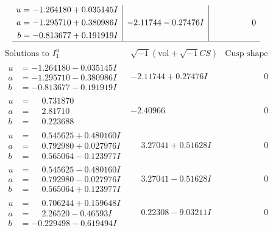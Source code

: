 \documentclass[1p]{elsarticle_modified}
\theoremstyle{definition}
\newcommand{\I}{\sqrt{-1}}
\begin{document}
$$\begin{array}{c|c|c}
\begin{aligned}
u &= -1.264180 + 0.035145 I \\
a &= -1.295710 + 0.380986 I \\
b &= -0.813677 + 0.191919 I\end{aligned}
 & -2.11744 - 0.27476 I & \phantom{-0.000000 } 0\\
 \hline 
 \end{array}$$\newpage$$\begin{array}{c|c|c}  
\text{Solutions to }I^u_{1}& \I (\text{vol} + \sqrt{-1}CS) & \text{Cusp shape}\\
 \hline 
\begin{aligned}
u &= -1.264180 - 0.035145 I \\
a &= -1.295710 - 0.380986 I \\
b &= -0.813677 - 0.191919 I\end{aligned}
 & -2.11744 + 0.27476 I & \phantom{-0.000000 } 0 \\ \hline\begin{aligned}
u &= \phantom{-}0.731870\phantom{ +0.000000I} \\
a &= \phantom{-}2.81710\phantom{ +0.000000I} \\
b &= \phantom{-}0.223688\phantom{ +0.000000I}\end{aligned}
 & -2.40966\phantom{ +0.000000I} & \phantom{-0.000000 } 0 \\ \hline\begin{aligned}
u &= \phantom{-}0.545625 + 0.480160 I \\
a &= \phantom{-}0.792980 + 0.027976 I \\
b &= \phantom{-}0.565064 - 0.123977 I\end{aligned}
 & \phantom{-}3.27041 + 0.51628 I & \phantom{-0.000000 } 0 \\ \hline\begin{aligned}
u &= \phantom{-}0.545625 - 0.480160 I \\
a &= \phantom{-}0.792980 - 0.027976 I \\
b &= \phantom{-}0.565064 + 0.123977 I\end{aligned}
 & \phantom{-}3.27041 - 0.51628 I & \phantom{-0.000000 } 0 \\ \hline\begin{aligned}
u &= \phantom{-}0.706244 + 0.159648 I \\
a &= \phantom{-}2.26520 - 0.46593 I \\
b &= -0.229498 - 0.619494 I\end{aligned}
 & \phantom{-}0.22308 - 9.03211 I & \phantom{-0.000000 } 0 \\ \hline\begin{aligned}

\end{aligned}
\end{array}$$
\end{document}
